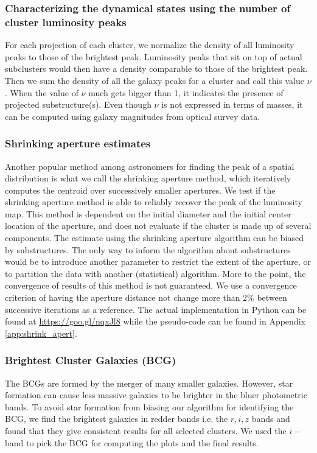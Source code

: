\subsubsection{Characterizing the dynamical states using the number of cluster
luminosity peaks}
\label{subsubsec:nu}
For each projection of each cluster, we normalize the density of all 
luminosity peaks to those of the brightest peak. 
Luminosity peaks that sit on top of actual subclusters would then have a density 
comparable to those of the brightest peak. 
Then we sum the density of all the galaxy peaks for a cluster and call this value
$\nu$. When the value of $\nu$ much gets bigger than 1, it indicates the presence 
of projected substructure(s). Even though 
$\nu$ is not expressed in terms of masses, it can be computed using galaxy
magnitudes from optical survey data. 

\subsubsection{Shrinking aperture estimates}

Another popular method among astronomers for finding the peak of a spatial
distribution is what we call the shrinking aperture method, which iteratively
computes the centroid over successively smaller apertures.
We test if the shrinking aperture method is able to reliably recover the 
peak of the luminosity map.
This method is dependent on the initial diameter and the initial center 
location of the aperture, and 
 does not evaluate if the cluster is made up of
several components.
The estimate using the shrinking aperture algorithm can be biased by
substructures. The only way to inform the algorithm about substructures would
be to introduce another parameter to restrict the extent of the aperture, or to
partition the data with another (statistical) algorithm.
More to the point, the convergence of results of this method is not guaranteed. We use a
convergence criterion of having the aperture distance not change more than 2\% 
between successive iterations as a reference. The actual implementation in
{\sc Python} can be found at \href{https://goo.gl/nqxJl8}{https://goo.gl/nqxJl8} while
the pseudo-code can be found in Appendix \ref{app:shrink_apert}.

\subsubsection{Brightest Cluster Galaxies (BCG)}
The BCGs are formed by the merger of many smaller
galaxies. However, star formation can cause
less massive galaxies to be brighter in the bluer photometric bands.
To avoid star formation from biasing our algorithm for identifying the
BCG, we find the brightest galaxies in redder bands i.e. the $r, i, z$
bands and found that they give consistent results for all selected clusters. 
We used the $i-$band to pick the BCG for computing the plots and the final results. 
 
